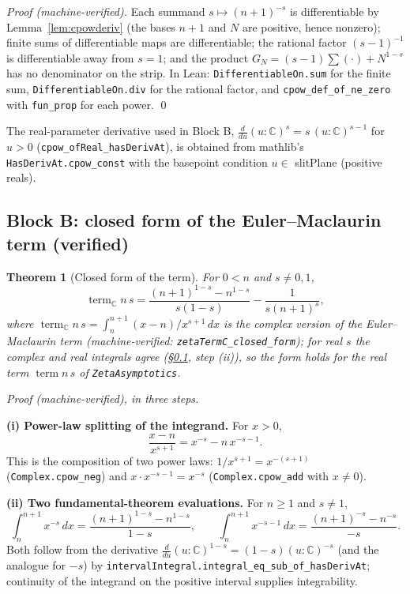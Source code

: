 \documentclass{article}
\newtheorem{theorem}{Theorem}[section]
\newcommand{\C}{\mathbb{C}}
\begin{document}
\emph{Proof (machine-verified).} Each summand $s\mapsto(n+1)^{-s}$ is
differentiable by Lemma~\ref{lem:cpowderiv} (the bases $n+1$ and $N$ are
positive, hence nonzero); finite sums of differentiable maps are
differentiable; the rational factor $(s-1)^{-1}$ is differentiable away
from $s=1$; and the product $G_N=(s-1)\sum(\cdot)+N^{1-s}$ has no
denominator on the strip. In Lean: \texttt{DifferentiableOn.sum} for the
finite sum, \texttt{DifferentiableOn.div} for the rational factor, and
\texttt{cpow\_def\_of\_ne\_zero} with \texttt{fun\_prop} for each power.
\qed

The real-parameter derivative used in Block B,
$\frac{d}{du}(u:\C)^s=s\,(u:\C)^{s-1}$ for $u>0$
(\texttt{cpow\_ofReal\_hasDerivAt}), is obtained from mathlib's
\texttt{HasDerivAt.cpow\_const} with the basepoint condition
$u\in$ slitPlane (positive reals).

\subsection{Block B: closed form of the Euler--Maclaurin term (verified)}
\label{sec:blockB}

\begin{theorem}[Closed form of the term]
\label{thm:closed}
For $0<n$ and $s\neq 0,1$,
\begin{equation}
\label{eq:closed}
\operatorname{term}_{\C} n\,s
=\frac{(n+1)^{1-s}-n^{1-s}}{s(1-s)}-\frac{1}{s(n+1)^s},
\end{equation}
where $\operatorname{term}_{\C} n\,s=\int_n^{n+1}(x-n)/x^{s+1}\,dx$ is the
complex version of the Euler--Maclaurin term
(machine-verified: \texttt{zetaTermC\_closed\_form}); for real $s$ the
complex and real integrals agree (\S\ref{sec:blockB}, step (ii)), so the
form holds for the real term $\operatorname{term} n\,s$ of
\texttt{ZetaAsymptotics}.
\end{theorem}

\emph{Proof (machine-verified), in three steps.}

\textbf{(i) Power-law splitting of the integrand.} For $x>0$,
\[
\frac{x-n}{x^{s+1}}=x^{-s}-n\,x^{-s-1}.
\]
This is the composition of two power laws: $1/x^{s+1}=x^{-(s+1)}$
(\texttt{Complex.cpow\_neg}) and $x\cdot x^{-s-1}=x^{-s}$
(\texttt{Complex.cpow\_add} with $x\neq 0$).

\textbf{(ii) Two fundamental-theorem evaluations.} For $n\ge 1$ and
$s\neq 1$,
\[
\int_n^{n+1}x^{-s}\,dx=\frac{(n+1)^{1-s}-n^{1-s}}{1-s},
\qquad
\int_n^{n+1}x^{-s-1}\,dx=\frac{(n+1)^{-s}-n^{-s}}{-s}.
\]
Both follow from the derivative
$\frac{d}{du}(u:\C)^{1-s}=(1-s)(u:\C)^{-s}$ (and the analogue for
$-s$) by \texttt{intervalIntegral.integral\_eq\_sub\_of\_hasDerivAt};
continuity of the integrand on the positive interval supplies
integrability.
\end{document}
